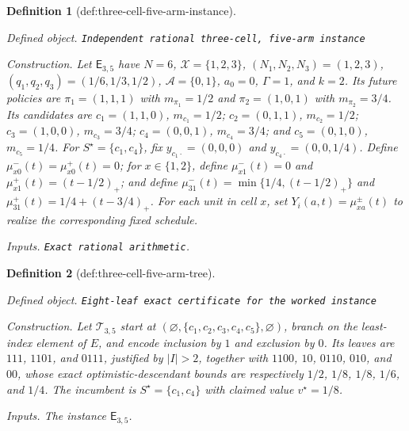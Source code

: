 \documentclass{article}
\newtheorem{definition}{Definition}
\begin{document}
\begin{definition}[def:three-cell-five-arm-instance]\label{def:three-cell-five-arm-instance}
\par\smallskip\noindent\emph{Defined object.} \texttt{Independent rational three-\allowbreak{}cell,\allowbreak{} five-\allowbreak{}arm instance}
\par\smallskip\noindent\emph{Construction.} Let \(\mathsf E_{3,5}\) have \(N=6\), \(\mathcal X=\{1,2,3\}\), \((N_1,N_2,N_3)=(1,2,3)\), \((q_1,q_2,q_3)=(1/6,1/3,1/2)\), \(\mathcal A=\{0,1\}\), \(a_0=0\), \(\Gamma=1\), and \(k=2\). Its future policies are \(\pi_1=(1,1,1)\) with \(m_{\pi_1}=1/2\) and \(\pi_2=(1,0,1)\) with \(m_{\pi_2}=3/4\). Its candidates are \(c_1=(1,1,0)\), \(m_{c_1}=1/2\); \(c_2=(0,1,1)\), \(m_{c_2}=1/2\); \(c_3=(1,0,0)\), \(m_{c_3}=3/4\); \(c_4=(0,0,1)\), \(m_{c_4}=3/4\); and \(c_5=(0,1,0)\), \(m_{c_5}=1/4\). For \(S^{\star}=\{c_1,c_4\}\), fix \(y_{c_1\cdot}=(0,0,0)\) and \(y_{c_4\cdot}=(0,0,1/4)\). Define \(\mu^-_{x0}(t)=\mu^+_{x0}(t)=0\); for \(x\in\{1,2\}\), define \(\mu^-_{x1}(t)=0\) and \(\mu^+_{x1}(t)=(t-1/2)_+\); and define \(\mu^-_{31}(t)=\min\{1/4,(t-1/2)_+\}\) and \(\mu^+_{31}(t)=1/4+(t-3/4)_+\). For each unit in cell \(x\), set \(Y_i(a,t)=\mu^{\pm}_{xa}(t)\) to realize the corresponding fixed schedule.
\par\smallskip\noindent\emph{Inputs.} \texttt{Exact rational arithmetic}.
\end{definition}

\begin{definition}[def:three-cell-five-arm-tree]\label{def:three-cell-five-arm-tree}
\par\smallskip\noindent\emph{Defined object.} \texttt{Eight-\allowbreak{}leaf exact certificate for the worked instance}
\par\smallskip\noindent\emph{Construction.} Let \(\mathcal T_{3,5}\) start at \((\varnothing,\{c_1,c_2,c_3,c_4,c_5\},\varnothing)\), branch on the least-index element of \(E\), and encode inclusion by \(1\) and exclusion by \(0\). Its leaves are \(111\), \(1101\), and \(0111\), justified by \(|I|>2\), together with \(1100\), \(10\), \(0110\), \(010\), and \(00\), whose exact optimistic-descendant bounds are respectively \(1/2\), \(1/8\), \(1/8\), \(1/6\), and \(1/4\). The incumbent is \(S^{\star}=\{c_1,c_4\}\) with claimed value \(v^{\star}=1/8\).
\par\smallskip\noindent\emph{Inputs.} The instance \(\mathsf E_{3,5}\).
\end{definition}
\end{document}
